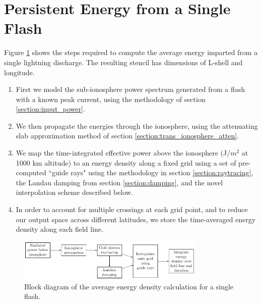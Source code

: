 \section{Persistent Energy from a Single Flash}
Figure \ref{fig:power_blockdiagram} shows the steps required to compute the average energy imparted from a single lightning discharge. The resulting stencil has dimensions of L-shell and longitude.
\begin{enumerate}
\item{First we model the sub-ionosphere power spectrum generated from a flash with a known peak current, using the methodology of section \ref{section:input_power}.}
\item{We then propagate the energies through the ionosphere, using the attenuating slab approximation method of section \ref{section:trans_ionosphere_atten}.}
\item{We map the time-integrated effective power above the ionosphere (J/$m^2$ at 1000 km altitude) to an energy density along a fixed grid using a set of pre-computed ``guide rays" using the methodology in section \ref{section:raytracing}, the Landau damping from section \ref{section:damping}, and the novel interpolation scheme described below.}
\item{In order to account for multiple crossings at each grid point, and to reduce our output space across different latitudes, we store the time-averaged energy density along each field line.}
 \end{enumerate}
\begin{figure}
\begin{center}
\includegraphics[width=0.8\textwidth]{figures/lightning_power_block_diagram.pdf}
\caption[Energy density calculation block diagram]{Block diagram of the average energy density calculation for a single flash.}
\label{fig:power_blockdiagram}
\end{center}
\end{figure}


